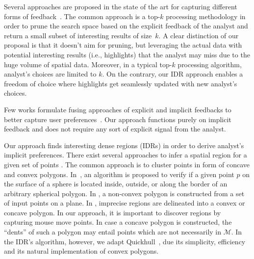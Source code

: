 \documentclass[sigconf,edbt]{acmart-edbt2019}
\begin{document}
\vspace{3pt}
 Several approaches are proposed in the state of the art for capturing different forms of feedback~\cite{bhuiyan2012interactive,xin2006discovering,dimitriadou2016aide,kamat2014distributed,Omidvar-Tehrani:2015,boley2013one}. The common approach is a top-$k$ processing methodology in order to prune the search space based on the explicit feedback of the analyst and return a small subset of interesting results of size~$k$. A clear distinction of our proposal is that it doesn't aim for pruning, but leveraging the actual data with potential interesting results (i.e., highlights) that the analyst may miss due to the huge volume of spatial data. Moreover, in a typical top-$k$ processing algorithm, analyst's choices are limited to $k$. On the contrary, our IDR approach enables a freedom of choice where highlights get seamlessly updated with new analyst's choices. 

\vspace{2pt}
Few works formulate fusing approaches of explicit and implicit feedbacks to better capture user preferences~\cite{AoidhBW07,Ballatore2008,Liu:2010}. Our approach functions purely on implicit feedback and does not require any sort of explicit signal from the analyst.

\vspace{3pt}
 Our approach finds interesting dense regions (IDRs) in order to derive analyst's implicit preferences. There exist several approaches to infer a spatial region for a given set of points \cite{Bevis1989,DUCKHAM2008,FADILI2004,ARAMPATZIS2006,Galton2006,Barber:1996}. The common approach is to cluster points in form of concave and convex polygons. In~\cite{Bevis1989}, an algorithm is proposed to verify if a given point $p$ on the surface of a sphere is located inside, outside, or along the border of an arbitrary spherical polygon. In \cite{DUCKHAM2008,FADILI2004}, a non-convex polygon is constructed from a set of input points on a plane. In \cite{ARAMPATZIS2006,Galton2006}, imprecise regions are delineated into a convex or concave polygon. In our approach, it is important to discover regions by capturing mouse move points. In case a concave polygon is constructed, the ``dents'' of such a polygon may entail points which are not necessarily in $\mathcal{M}$. In the IDR's algorithm, however, we adapt Quickhull~\cite{Barber:1996}, due its simplicity, efficiency and its natural implementation of convex polygons.
\end{document}
